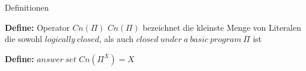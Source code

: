 \begin{frame}{Definitionen}
  \begin{block}{\textbf{Define:} Operator $Cn(\Pi)$}
  $Cn(\Pi)$ bezeichnet die kleinste Menge von Literalen die sowohl
  $logically~closed$, als auch $closed~under~a~basic~program~\Pi$ ist
  \end{block}
  \begin{block}{\textbf{Define:} $answer~set$}
    $Cn(\Pi^X)=X$
  \end{block}
\end{frame}


